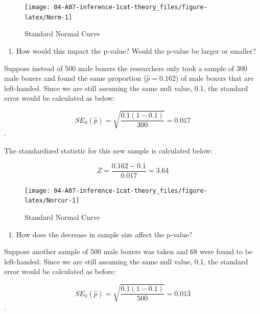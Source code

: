 \documentclass[
]{report}
\providecommand{\tightlist}{%
  \setlength{\itemsep}{0pt}\setlength{\parskip}{0pt}}
\begin{document}
\begin{figure}

{\centering \texttt{[image: 04-A07-inference-1cat-theory\_files/figure-latex/Norm-1]} 

}

\caption{Standard Normal Curve}\label{fig:Norm}
\end{figure}

\begin{enumerate}
\def\labelenumi{\arabic{enumi}.}
\setcounter{enumi}{10}
\tightlist
\item
  How would this impact the p-value? Would the p-value be larger or smaller?
\end{enumerate}

\vspace{0.2in}

Suppose instead of 500 male boxers the researchers only took a sample of 300 male boxers and found the same proportion (\(\hat{p}=0.162\)) of male boxers that are left-handed. Since we are still assuming the same null value, 0.1, the standard error would be calculated as below:

\[SE_0(\hat{p})=\sqrt{\frac{0.1(1-0.1)}{300}} = 0.017\].

The standardized statistic for this new sample is calculated below:

\[Z = \frac{0.162-0.1}{0.017} = 3.64\]

\newpage

\begin{figure}

{\centering \texttt{[image: 04-A07-inference-1cat-theory\_files/figure-latex/Norcur-1]} 

}

\caption{Standard Normal Curve}\label{fig:Norcur}
\end{figure}

\begin{enumerate}
\def\labelenumi{\arabic{enumi}.}
\setcounter{enumi}{11}
\tightlist
\item
  How does the decrease in sample size affect the p-value?
\end{enumerate}

\vspace{0.3in}

Suppose another sample of 500 male boxers was taken and 68 were found to be left-handed. Since we are still assuming the same null value, 0.1, the standard error would be calculated as before:

\[SE_0(\hat{p})=\sqrt{\frac{0.1(1-0.1)}{500}} = 0.013\].
\end{document}
